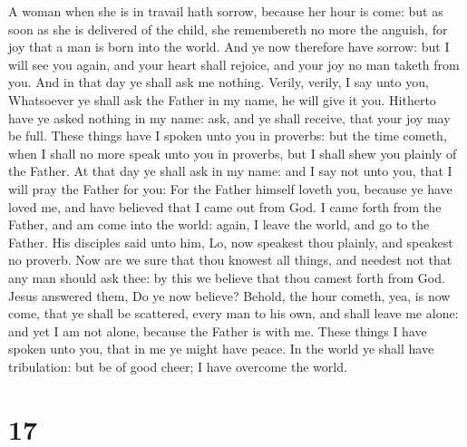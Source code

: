  A woman when she is in travail hath sorrow, because her
hour is come: but as soon as she is delivered of the child, she
remembereth no more the anguish, for joy that a man is born into the
world.  And ye now therefore have sorrow: but I will see
you again, and your heart shall rejoice, and your joy no man taketh from
you.  And in that day ye shall ask me nothing. Verily,
verily, I say unto you, Whatsoever ye shall ask the Father in my name,
he will give it you.  Hitherto have ye asked nothing in my
name: ask, and ye shall receive, that your joy may be full.
 These things have I spoken unto you in proverbs: but the
time cometh, when I shall no more speak unto you in proverbs, but I
shall shew you plainly of the Father.  At that day ye shall
ask in my name: and I say not unto you, that I will pray the Father for
you:  For the Father himself loveth you, because ye have
loved me, and have believed that I came out from God.  I
came forth from the Father, and am come into the world: again, I leave
the world, and go to the Father.  His disciples said unto
him, Lo, now speakest thou plainly, and speakest no proverb.
 Now are we sure that thou knowest all things, and needest
not that any man should ask thee: by this we believe that thou camest
forth from God.  Jesus answered them, Do ye now believe?
 Behold, the hour cometh, yea, is now come, that ye shall
be scattered, every man to his own, and shall leave me alone: and yet I
am not alone, because the Father is with me.  These things
I have spoken unto you, that in me ye might have peace. In the world ye
shall have tribulation: but be of good cheer; I have overcome the world.

\hypertarget{section-16}{%
\section{17}\label{section-16}}

